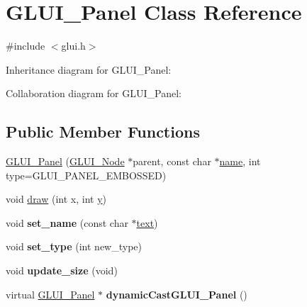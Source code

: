 \hypertarget{class_g_l_u_i___panel}{\section{G\+L\+U\+I\+\_\+\+Panel Class Reference}
\label{class_g_l_u_i___panel}
}


{\ttfamily \#include $<$glui.\+h$>$}



Inheritance diagram for G\+L\+U\+I\+\_\+\+Panel\+:


Collaboration diagram for G\+L\+U\+I\+\_\+\+Panel\+:
\subsection*{Public Member Functions}
\begin{DoxyCompactItemize}
\item 
\hyperlink{class_g_l_u_i___panel_a6a297a441e3f921199347184ded52aca}{G\+L\+U\+I\+\_\+\+Panel} (\hyperlink{class_g_l_u_i___node}{G\+L\+U\+I\+\_\+\+Node} $\ast$parent, const char $\ast$\hyperlink{class_g_l_u_i___control_aa95b97d50df45335fc33f0af03958eb3}{name}, int type=G\+L\+U\+I\+\_\+\+P\+A\+N\+E\+L\+\_\+\+E\+M\+B\+O\+S\+S\+E\+D)
\item 
void \hyperlink{class_g_l_u_i___panel_a8038a76f6c88613735f7c65ae9466b0c}{draw} (int x, int \hyperlink{_ice_utils_8h_aa7ffaed69623192258fb8679569ff9ba}{y})
\item 
\hypertarget{class_g_l_u_i___panel_a5f76f22a34d3c131e3ace71d24c47d3e}{void {\bfseries set\+\_\+name} (const char $\ast$\hyperlink{class_g_l_u_i___control_af0d60e9736f4dbc34e9a536e75876d72}{text})}\label{class_g_l_u_i___panel_a5f76f22a34d3c131e3ace71d24c47d3e}

\item 
\hypertarget{class_g_l_u_i___panel_aee5e41798d60ac2e4707373be14fd39f}{void {\bfseries set\+\_\+type} (int new\+\_\+type)}\label{class_g_l_u_i___panel_aee5e41798d60ac2e4707373be14fd39f}

\item 
\hypertarget{class_g_l_u_i___panel_ab377b608f9b1006fb67d78e41a1f95d6}{void {\bfseries update\+\_\+size} (void)}\label{class_g_l_u_i___panel_ab377b608f9b1006fb67d78e41a1f95d6}

\item 
\hypertarget{class_g_l_u_i___panel_a96cd95d0e0a4fb65466e93c686317b43}{virtual \hyperlink{class_g_l_u_i___panel}{G\+L\+U\+I\+\_\+\+Panel} $\ast$ {\bfseries dynamic\+Cast\+G\+L\+U\+I\+\_\+\+Panel} ()}\label{class_g_l_u_i___panel_a96cd95d0e0a4fb65466e93c686317b43}

\end{DoxyCompactItemize}
